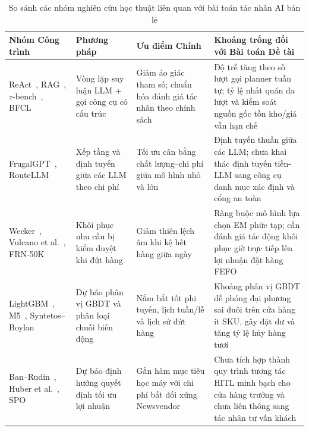 \begin{table}[H]
\centering
\caption{So sánh các nhóm nghiên cứu học thuật liên quan với bài toán tác nhân AI bán lẻ}
\label{tab:lit_comparison}
\footnotesize
\begin{tabularx}{\textwidth}{L{3.1cm} L{2.8cm} L{4.0cm} Y}
\toprule
\textbf{Nhóm Công trình} & \textbf{Phương pháp} & \textbf{Ưu điểm Chính} & \textbf{Khoảng trống đối với Bài toán Đề tài} \\
\midrule
ReAct~\cite{yao2023react}, RAG~\cite{lewis2020rag}, $\tau$-bench~\cite{yao2024taubench}, BFCL~\cite{patil2024gorilla} & Vòng lặp suy luận LLM + gọi công cụ có cấu trúc & Giảm ảo giác tham số; chuẩn hóa đánh giá tác nhân theo chính sách & Độ trễ tăng theo số lượt gọi planner tuần tự; tỷ lệ nhất quán đa lượt và kiểm soát nguồn gốc tồn kho/giá vẫn hạn chế \\
FrugalGPT~\cite{chen2023frugalgpt}, RouteLLM~\cite{ong2024routellm} & Xếp tầng và định tuyến giữa các LLM theo chi phí & Tối ưu cân bằng chất lượng--chi phí giữa mô hình nhỏ và lớn & Định tuyến thuần giữa các LLM; chưa khai thác định tuyến tiền-LLM sang công cụ danh mục xác định và cổng an toàn \\
Wecker~\cite{wecker1978stockouts}, Vulcano et al.~\cite{vulcano2012primary}, FRN-50K~\cite{freshretailnet50k} & Khôi phục nhu cầu bị kiểm duyệt khi đứt hàng & Giảm thiên lệch âm khi kệ hết hàng giữa ngày & Ràng buộc mô hình lựa chọn EM phức tạp; cần đánh giá tác động khôi phục giờ trực tiếp lên lợi nhuận đặt hàng FEFO \\
LightGBM~\cite{ke2017lightgbm}, M5~\cite{makridakis2022m5}, Syntetos--Boylan~\cite{syntetos2005intermittent} & Dự báo phân vị GBDT và phân loại chuỗi biến động & Nắm bắt tốt phi tuyến, lịch tuần/lễ và lịch sử đứt hàng & Khoảng phân vị GBDT dễ phóng đại phương sai đuôi trên cửa hàng ít SKU, gây đặt dư và tăng tỷ lệ hủy hàng tươi \\
Ban--Rudin~\cite{ban2019bigdata}, Huber et al.~\cite{huber2019newsvendor}, SPO~\cite{elmachtoub2022spo} & Dự báo định hướng quyết định tối ưu lợi nhuận & Gắn hàm mục tiêu học máy với chi phí bất đối xứng Newsvendor & Chưa tích hợp thành quy trình tương tác HITL minh bạch cho cửa hàng trưởng và chưa liên thông sang tác nhân tư vấn khách \\
\bottomrule
\end{tabularx}
\end{table}

